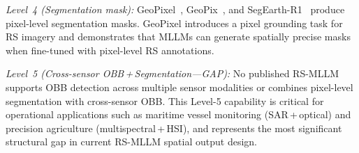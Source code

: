 \textit{Level~4 (Segmentation mask):} GeoPixel~\cite{geopixel2025},
GeoPix~\cite{geopix2025}, and SegEarth-R1~\cite{segearth2026} produce pixel-level
segmentation masks. GeoPixel introduces a pixel grounding task for RS imagery and
demonstrates that MLLMs can generate spatially precise masks when fine-tuned with
pixel-level RS annotations.

\textit{Level~5 (Cross-sensor OBB\,+\,Segmentation---GAP):} No published RS-MLLM
supports OBB detection across multiple sensor modalities or combines pixel-level
segmentation with cross-sensor OBB. This Level-5 capability is critical for operational
applications such as maritime vessel monitoring (SAR\,+\,optical) and precision
agriculture (multispectral\,+\,HSI), and represents the most significant structural gap
in current RS-MLLM spatial output design.

